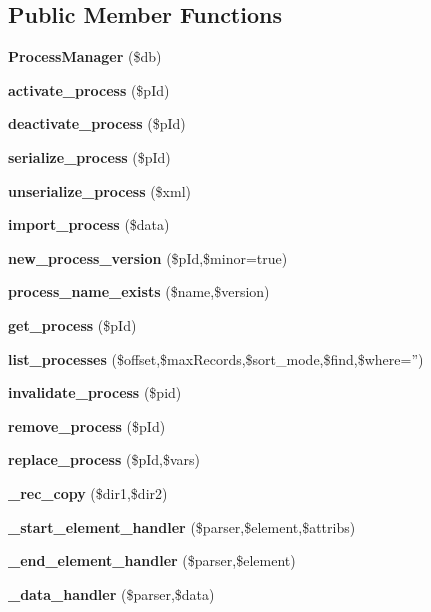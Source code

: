 \subsection*{Public Member Functions}
\begin{CompactItemize}
\item 
{\bf Process\-Manager} (\$db)
\item 
{\bf activate\_\-process} (\$p\-Id)
\item 
{\bf deactivate\_\-process} (\$p\-Id)
\item 
{\bf serialize\_\-process} (\$p\-Id)
\item 
{\bf unserialize\_\-process} (\$xml)
\item 
{\bf import\_\-process} (\$data)
\item 
{\bf new\_\-process\_\-version} (\$p\-Id,\$minor=true)
\item 
{\bf process\_\-name\_\-exists} (\$name,\$version)
\item 
{\bf get\_\-process} (\$p\-Id)
\item 
{\bf list\_\-processes} (\$offset,\$max\-Records,\$sort\_\-mode,\$find,\$where='')
\item 
{\bf invalidate\_\-process} (\$pid)
\item 
{\bf remove\_\-process} (\$p\-Id)
\item 
{\bf replace\_\-process} (\$p\-Id,\$vars)
\item 
{}
{\bf \_\-rec\_\-copy} (\$dir1,\$dir2)\label{classProcessManager_a13}

\item 
{}
{\bf \_\-start\_\-element\_\-handler} (\$parser,\$element,\$attribs)\label{classProcessManager_a14}

\item 
{}
{\bf \_\-end\_\-element\_\-handler} (\$parser,\$element)\label{classProcessManager_a15}

\item 
{}
{\bf \_\-data\_\-handler} (\$parser,\$data)\label{classProcessManager_a16}

\end{CompactItemize}
